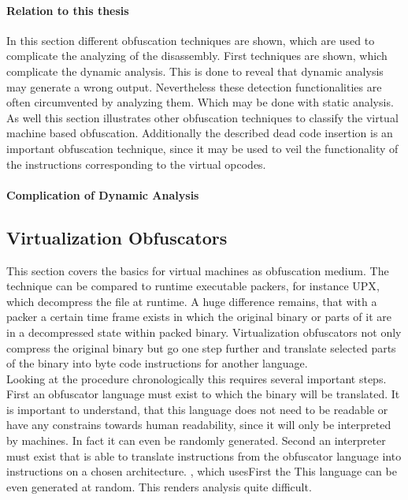 \documentclass[10pt,twoside,a4paper,bibliography=totoc]{scrbook}
\begin{document}
\paragraph*{Relation to this thesis}
In this section different obfuscation techniques are shown, which are used to 
complicate the analyzing of the disassembly.
First techniques are shown, which complicate the dynamic analysis.
This is done to reveal that dynamic analysis may generate a wrong output.
Nevertheless these detection functionalities are often circumvented by analyzing
them. 
Which may be done with static analysis.
As well this section illustrates other obfuscation techniques to classify the 
virtual machine based obfuscation.
Additionally the described dead code insertion is  an important obfuscation technique,
since it may be used to veil the functionality of the instructions corresponding 
to the virtual opcodes.

\paragraph{Complication of Dynamic Analysis}

\subsection{Virtualization Obfuscators}
\label{sec2:virtobfu}
This section covers the basics for virtual machines as obfuscation medium. The technique can be compared to runtime executable packers, for instance UPX\cite{vm_prot}, which decompress the file at runtime. A huge difference remains, that with a packer a certain time frame exists in which the original binary or parts of it are in a decompressed state within packed binary. Virtualization obfuscators not only compress the original binary but go one step further and translate selected parts of the binary into byte code instructions for another language.\\
Looking at the procedure chronologically this requires several important steps. First an obfuscator language must exist to which the binary will be translated. It is important to understand, that this language does not need to be readable or have any constrains towards human readability, since it will only be interpreted by machines. In fact it can even be randomly generated.
Second an interpreter must exist that is able to translate instructions from the obfuscator language into instructions on a chosen architecture. , which usesFirst the This language can be even generated at random. This renders analysis quite difficult. 
\end{document}
